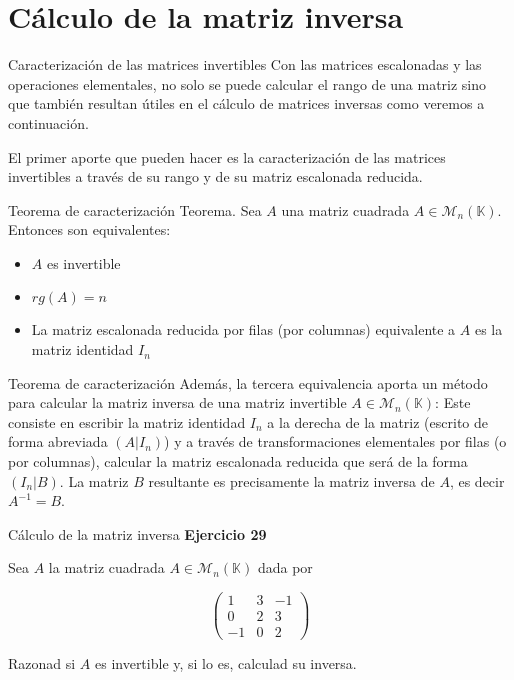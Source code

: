 \documentclass[
  ignorenonframetext,
]{beamer}
\providecommand{\tightlist}{%
  \setlength{\itemsep}{0pt}\setlength{\parskip}{0pt}}
\begin{document}
\hypertarget{cuxe1lculo-de-la-matriz-inversa}{%
\section{Cálculo de la matriz
inversa}\label{cuxe1lculo-de-la-matriz-inversa}}

\begin{frame}{Caracterización de las matrices invertibles}
\protect\hypertarget{caracterizaciuxf3n-de-las-matrices-invertibles}{}
Con las matrices escalonadas y las operaciones elementales, no solo se
puede calcular el rango de una matriz sino que también resultan útiles
en el cálculo de matrices inversas como veremos a continuación.

El primer aporte que pueden hacer es la caracterización de las matrices
invertibles a través de su rango y de su matriz escalonada reducida.
\end{frame}

\begin{frame}{Teorema de caracterización}
\protect\hypertarget{teorema-de-caracterizaciuxf3n}{}
Teorema. Sea \(A\) una matriz cuadrada
\(A\in\mathcal{M}_n(\mathbb{K})\). Entonces son equivalentes:

\begin{itemize}
\tightlist
\item
  \(A\) es invertible
\item
  \(rg(A)=n\)
\item
  La matriz escalonada reducida por filas (por columnas) equivalente a
  \(A\) es la matriz identidad \(I_n\)
\end{itemize}
\end{frame}

\begin{frame}{Teorema de caracterización}
\protect\hypertarget{teorema-de-caracterizaciuxf3n-1}{}
Además, la tercera equivalencia aporta un método para calcular la matriz
inversa de una matriz invertible \(A\in\mathcal{M}_n(\mathbb{K})\): Este
consiste en escribir la matriz identidad \(I_n\) a la derecha de la
matriz (escrito de forma abreviada \((A|I_n)\)) y a través de
transformaciones elementales por filas (o por columnas), calcular la
matriz escalonada reducida que será de la forma \((I_n|B)\). La matriz
\(B\) resultante es precisamente la matriz inversa de \(A\), es decir
\(A^{-1}=B\).
\end{frame}

\begin{frame}{Cálculo de la matriz inversa}
\protect\hypertarget{cuxe1lculo-de-la-matriz-inversa-1}{}
\textbf{Ejercicio 29}

Sea \(A\) la matriz cuadrada \(A\in\mathcal{M}_n(\mathbb{K})\) dada por

\[\begin{pmatrix}1&3&-1\\0&2&3\\ -1&0&2\end{pmatrix}\]

Razonad si \(A\) es invertible y, si lo es, calculad su inversa.
\end{frame}
\end{document}
